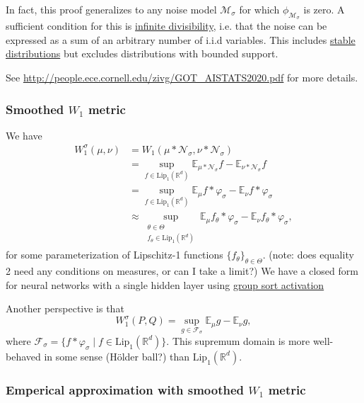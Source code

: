 \documentclass{article}
\newcommand{\R}{\mathbb{R}}
\newcommand{\E}{\mathbb{E}}
\newcommand{\Lip}{\mathrm{Lip}}
\newcommand{\N}{\mathcal{N}}
\begin{document}
In fact, this proof generalizes to any noise model $\mathcal{M}_\sigma$ for which $\phi_{\mathcal{M}_\sigma}$ is zero. A sufficient condition for this is \href{https://en.wikipedia.org/wiki/Infinite_divisibility_(probability)}{infinite divisibility}, i.e. that the noise can be expressed as a sum of an arbitrary number of i.i.d variables. This includes \href{https://en.wikipedia.org/wiki/Stable_distribution}{stable distributions} but excludes distributions with bounded support.

See \url{http://people.ece.cornell.edu/zivg/GOT_AISTATS2020.pdf} for more details.

\subsubsection{Smoothed \texorpdfstring{$W_1$}{W1} metric}
We have
\begin{align*}
    W_1^\sigma(\mu,\nu) &= W_1(\mu * \N_\sigma, \nu * \N_\sigma)\\
    &= \sup_{f \in \Lip_1(\R^d)} \E_{\mu * \N_\sigma} f - \E_{\nu * \N_\sigma}f\\
    &= \sup_{f \in \Lip_1(\R^d)} \E_{\mu} f * \varphi_\sigma - \E_{\nu} f * \varphi_\sigma\\
    &\approx \sup_{\substack{\theta \in \Theta\\f_\theta \in \Lip_1(\R^d)}} \E_\mu f_\theta * \varphi_\sigma - \E_\nu f_\theta * \varphi_\sigma,
\end{align*}
for some parameterization of Lipschitz-1 functions $\{f_\theta\}_{\theta \in \Theta}$. (note: does equality 2 need any conditions on measures, or can I take a limit?) We have a closed form for neural networks with a single hidden layer using \href{https://arxiv.org/pdf/1811.05381.pdf}{group sort activation}

Another perspective is that
\begin{equation*}
    W_1^\sigma(P,Q) = \sup_{g \in \mathcal{F}_\sigma} \E_\mu g - \E_\nu g,
\end{equation*}
where $\mathcal{F}_\sigma = \{ f * \varphi_\sigma \mid f \in \Lip_1(\R^d)\}$. This supremum domain is more well-behaved in some sense (H\"older ball?) than $\Lip_1(\R^d)$. 

\subsubsection{Emperical approximation with smoothed \texorpdfstring{$W_1$}{W1} metric}
\end{document}
